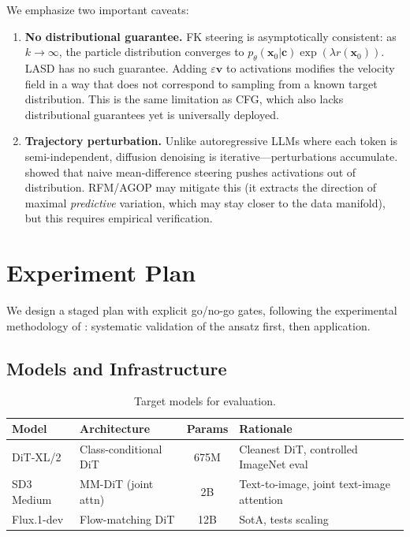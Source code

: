 \documentclass[11pt]{article}
\newcommand{\bx}{\mathbf{x}}
\newcommand{\bv}{\mathbf{v}}
\newcommand{\bc}{\mathbf{c}}
\begin{document}
We emphasize two important caveats:
\begin{enumerate}[leftmargin=*]
    \item \textbf{No distributional guarantee.} FK steering is asymptotically consistent: as $k \to \infty$, the particle distribution converges to $p_\theta(\bx_0|\bc)\exp(\lambda r(\bx_0))$.
    LASD has no such guarantee.
    Adding $\varepsilon\bv$ to activations modifies the velocity field in a way that does not correspond to sampling from a known target distribution.
    This is the same limitation as CFG, which also lacks distributional guarantees yet is universally deployed.
    \item \textbf{Trajectory perturbation.} Unlike autoregressive LLMs where each token is semi-independent, diffusion denoising is iterative---perturbations accumulate.
    \citet{lyu2025activation} showed that naive mean-difference steering pushes activations out of distribution.
    RFM/AGOP may mitigate this (it extracts the direction of maximal \emph{predictive} variation, which may stay closer to the data manifold), but this requires empirical verification.
\end{enumerate}

\section{Experiment Plan}
\label{sec:experiments}

We design a staged plan with explicit go/no-go gates, following the experimental methodology of \citet{radhakrishnan2024mechanism,beaglehole2026universal}: systematic validation of the ansatz first, then application.

\subsection{Models and Infrastructure}

\begin{table}[h]
\centering
\caption{Target models for evaluation.}
\label{tab:models}
\begin{tabular}{llcl}
\toprule
\textbf{Model} & \textbf{Architecture} & \textbf{Params} & \textbf{Rationale} \\
\midrule
DiT-XL/2 & Class-conditional DiT & 675M & Cleanest DiT, controlled ImageNet eval \\
SD3 Medium & MM-DiT (joint attn) & 2B & Text-to-image, joint text-image attention \\
Flux.1-dev & Flow-matching DiT & 12B & SotA, tests scaling \\
\bottomrule
\end{tabular}
\end{table}
\end{document}
